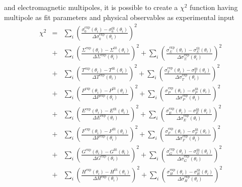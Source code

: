 \documentclass[a4paper,10pt]{article}
\begin{document}
and electromagnetic multipoles, it is possible to create a $\chi^2$ function having multipole as fit parameters and physical
observables as experimental input
\begin{displaymath}
\begin{array}{lcl}
\chi^2
&=& \sum\limits_i \left(
\frac
{\sigma_0^\mathrm{exp}(\theta_i) - \sigma_0^\mathrm{fit}(\theta_i)}
{\Delta \sigma_0^\mathrm{exp}(\theta_i)}
\right)^2\\
&+& \sum\limits_i \left(
\frac
{\Sigma^\mathrm{exp}(\theta_i) - \Sigma^\mathrm{fit}(\theta_i)}
{\Delta \Sigma^\mathrm{exp}(\theta_i)}
\right)^2
+ \sum\limits_i \left(
\frac
{\sigma_\Sigma^\mathrm{exp}(\theta_i) - \sigma_\Sigma^\mathrm{fit}(\theta_i)}
{\Delta \sigma_\Sigma^\mathrm{exp}(\theta_i)}
\right)^2\\
&+& \sum\limits_i \left(
\frac
{T^\mathrm{exp}(\theta_i) - T^\mathrm{fit}(\theta_i)}
{\Delta T^\mathrm{exp}(\theta_i)}
\right)^2
+ \sum\limits_i \left(
\frac
{\sigma_T^\mathrm{exp}(\theta_i) - \sigma_T^\mathrm{fit}(\theta_i)}
{\Delta \sigma_T^\mathrm{exp}(\theta_i)}
\right)^2\\
&+& \sum\limits_i \left(
\frac
{P^\mathrm{exp}(\theta_i) - P^\mathrm{fit}(\theta_i)}
{\Delta P^\mathrm{exp}(\theta_i)}
\right)^2
+ \sum\limits_i \left(
\frac
{\sigma_P^\mathrm{exp}(\theta_i) - \sigma_P^\mathrm{fit}(\theta_i)}
{\Delta \sigma_P^\mathrm{exp}(\theta_i)}
\right)^2\\
&+& \sum\limits_i \left(
\frac
{E^\mathrm{exp}(\theta_i) - E^\mathrm{fit}(\theta_i)}
{\Delta E^\mathrm{exp}(\theta_i)}
\right)^2
+ \sum\limits_i \left(
\frac
{\sigma_E^\mathrm{exp}(\theta_i) - \sigma_E^\mathrm{fit}(\theta_i)}
{\Delta \sigma_E^\mathrm{exp}(\theta_i)}
\right)^2\\
&+& \sum\limits_i \left(
\frac
{F^\mathrm{exp}(\theta_i) - F^\mathrm{fit}(\theta_i)}
{\Delta F^\mathrm{exp}(\theta_i)}
\right)^2
+ \sum\limits_i \left(
\frac
{\sigma_F^\mathrm{exp}(\theta_i) - \sigma_F^\mathrm{fit}(\theta_i)}
{\Delta \sigma_F^\mathrm{exp}(\theta_i)}
\right)^2\\
&+& \sum\limits_i \left(
\frac
{G^\mathrm{exp}(\theta_i) - G^\mathrm{fit}(\theta_i)}
{\Delta G^\mathrm{exp}(\theta_i)}
\right)^2
+ \sum\limits_i \left(
\frac
{\sigma_G^\mathrm{exp}(\theta_i) - \sigma_G^\mathrm{fit}(\theta_i)}
{\Delta \sigma_G^\mathrm{exp}(\theta_i)}
\right)^2\\
&+& \sum\limits_i \left(
\frac
{H^\mathrm{exp}(\theta_i) - H^\mathrm{fit}(\theta_i)}
{\Delta H^\mathrm{exp}(\theta_i)}
\right)^2
+ \sum\limits_i \left(
\frac
{\sigma_H^\mathrm{exp}(\theta_i) - \sigma_H^\mathrm{fit}(\theta_i)}
{\Delta \sigma_H^\mathrm{exp}(\theta_i)}
\right)^2
\end{array}
\end{displaymath}
\end{document}
